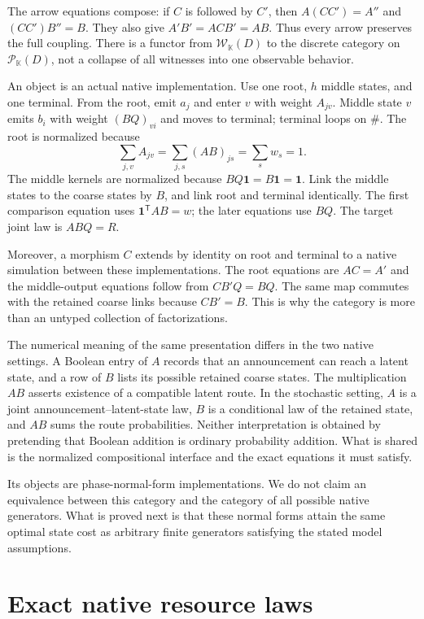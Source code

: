 \documentclass[11pt]{article}
\newcommand{\K}{\mathbb K}
\newcommand{\one}{\mathbf 1}
\newcommand{\W}{\mathcal W}
\newcommand{\Pcal}{\mathcal P}
\theoremstyle{remark}
\begin{document}
The arrow equations compose: if $C$ is followed by $C'$, then $A(CC')=A''$ and $(CC')B''=B$. They also give $A'B'=ACB'=AB$. Thus every arrow preserves the full coupling. There is a functor from $\W_\K(D)$ to the discrete category on $\Pcal_\K(D)$, not a collapse of all witnesses into one observable behavior.

An object is an actual native implementation. Use one root, $h$ middle states, and one terminal. From the root, emit $a_j$ and enter $v$ with weight $A_{jv}$. Middle state $v$ emits $b_i$ with weight $(BQ)_{vi}$ and moves to terminal; terminal loops on $\#$. The root is normalized because
\[
 \sum_{j,v}A_{jv}
 =\sum_{j,s}(AB)_{js}=\sum_sw_s=1.
\]
The middle kernels are normalized because $BQ\one=B\one=\one$. Link the middle states to the coarse states by $B$, and link root and terminal identically. The first comparison equation uses $\one^{\mathsf T}AB=w$; the later equations use $BQ$. The target joint law is $ABQ=R$.

Moreover, a morphism $C$ extends by identity on root and terminal to a native simulation between these implementations. The root equations are $AC=A'$ and the middle-output equations follow from $CB'Q=BQ$. The same map commutes with the retained coarse links because $CB'=B$. This is why the category is more than an untyped collection of factorizations.

The numerical meaning of the same presentation differs in the two native settings. A Boolean entry of $A$ records that an announcement can reach a latent state, and a row of $B$ lists its possible retained coarse states. The multiplication $AB$ asserts existence of a compatible latent route. In the stochastic setting, $A$ is a joint announcement--latent-state law, $B$ is a conditional law of the retained state, and $AB$ sums the route probabilities. Neither interpretation is obtained by pretending that Boolean addition is ordinary probability addition. What is shared is the normalized compositional interface and the exact equations it must satisfy.

Its objects are phase-normal-form implementations. We do not claim an equivalence between this category and the category of all possible native generators. What is proved next is that these normal forms attain the same optimal state cost as arbitrary finite generators satisfying the stated model assumptions.

\section{Exact native resource laws}
\end{document}
